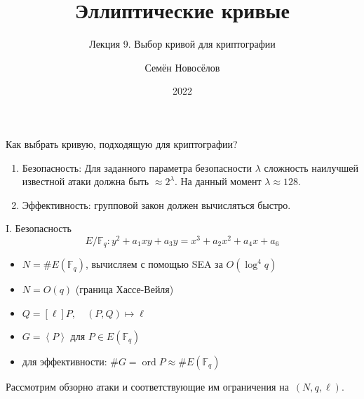 \documentclass{beamer}
\title{Эллиптические кривые}
\subtitle{Лекция 9. Выбор кривой для криптографии}
\author{Семён Новосёлов}
\institute{БФУ им. И. Канта}
\date{2022}
\begin{document}
\frame{\titlepage}


\begin{frame}{Как выбрать кривую, подходящую для криптографии?}
\begin{enumerate}
    \item Безопасность: Для заданного параметра безопасности $\lambda$ сложность наилучшей известной атаки должна быть $\approx 2^\lambda$. На данный момент $\lambda \approx 128$.
    \item Эффективность: групповой закон должен вычисляться быстро.
\end{enumerate}
\end{frame}

\begin{frame}{I. Безопасность}
\[
E/\mathbb{F}_q: y^2 + a_1 x y + a_3 y = x^3 + a_2 x^2 + a_4 x + a_6
\]
\begin{itemize}
    \item $N = \#E(\mathbb{F}_q)$, вычисляем с помощью SEA за $O(\log^4{q})$
    \item $N = O(q)$ (граница Хассе-Вейля)
    \item {}
    $
    Q = [\ell] P, \quad (P, Q) \mapsto \ell
    $
    \item $G = \left<P\right>$ для $P \in E(\mathbb{F}_q)$
    \item для эффективности: $\#G = \operatorname{ord}{P} \approx \#E(\mathbb{F}_q)$
\end{itemize}
Рассмотрим обзорно атаки и соответствующие им ограничения на~$(N,q,\ell)$.
\end{frame}
\end{document}
